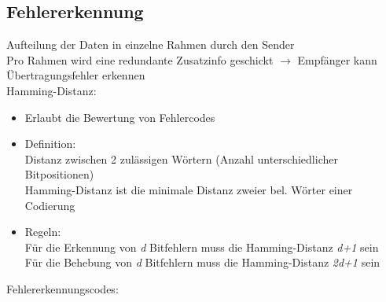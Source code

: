 \documentclass{scrreprt}
\begin{document}
\subsection{Fehlererkennung}
Aufteilung der Daten in einzelne Rahmen durch den Sender
\\Pro Rahmen wird eine redundante Zusatzinfo geschickt $\rightarrow$ Empfänger kann Übertragungsfehler erkennen
\\Hamming-Distanz:
\begin{itemize}
	\item Erlaubt die Bewertung von Fehlercodes
	\item Definition:
	\\Distanz zwischen 2 zulässigen Wörtern (Anzahl unterschiedlicher Bitpositionen)
	\\Hamming-Distanz ist die minimale Distanz zweier bel. Wörter einer Codierung
	\item Regeln:
	\\Für die Erkennung von \textit{d} Bitfehlern muss die Hamming-Distanz \textit{d+1} sein
	\\Für die Behebung von \textit{d} Bitfehlern muss die Hamming-Distanz \textit{2d+1} sein
\end{itemize}
Fehlererkennungscodes:
\end{document}
